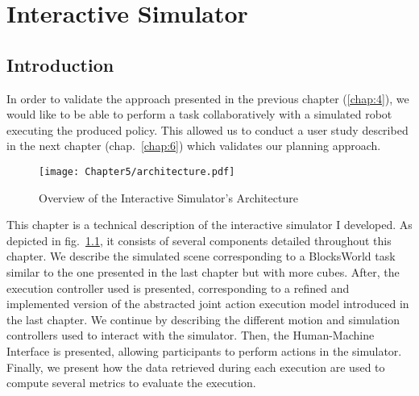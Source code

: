 \ifdefined{}
\else
\setcounter{chapter}{4} %
\dominitoc
\faketableofcontents
\fi

\chapter{Interactive Simulator}
\label{chap:5}
\minitoc


\section{Introduction}

In order to validate the approach presented in the previous chapter (\ref{chap:4}), we would like to be able to perform a task collaboratively with a simulated robot executing the produced policy. This allowed us to conduct a user study described in the next chapter (chap.~\ref{chap:6}) which validates our planning approach.


\begin{figure}
    \texttt{[image: Chapter5/architecture.pdf]}
    \caption{Overview of the Interactive Simulator's Architecture}
    \label{fig:architecture}
\end{figure}

This chapter is a technical description of the interactive simulator I developed. As depicted in fig.~\ref{fig:architecture}, it consists of several components detailed throughout this chapter. We describe the simulated scene corresponding to a BlocksWorld task similar to the one presented in the last chapter but with more cubes. After, the execution controller used is presented, corresponding to a refined and implemented version of the abstracted joint action execution model introduced in the last chapter. We continue by describing the different motion and simulation controllers used to interact with the simulator. Then, the Human-Machine Interface is presented, allowing participants to perform actions in the simulator. Finally, we present how the data retrieved during each execution are used to compute several metrics to evaluate the execution.  

